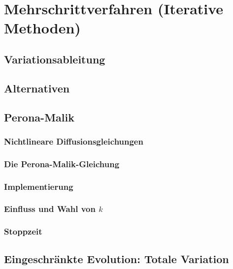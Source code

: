 \documentclass[a4paper, 11pt, accentcolor = tud3b]{tudreport}
\begin{document}
		\section{Mehrschrittverfahren (Iterative Methoden)} %

			\subsection{Variationsableitung} %

			\subsection{Alternativen} %

			\subsection{Perona-Malik} %

				\subsubsection{Nichtlineare Diffusionsgleichungen} %

				\subsubsection{Die Perona-Malik-Gleichung} %

				\subsubsection{Implementierung} %

				\subsubsection{Einfluss und Wahl von \(k\)} %

				\subsubsection{Stoppzeit} %

			\subsection{Eingeschränkte Evolution: Totale Variation} %
\end{document}
